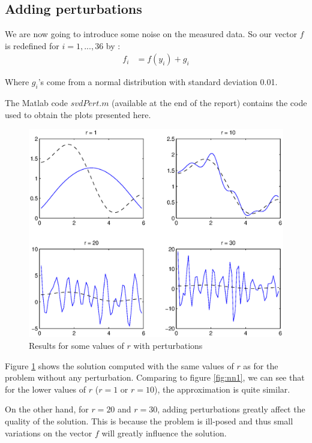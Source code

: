 \subsection*{Adding perturbations}

We are now going to introduce some noise on the measured data. So our vector $f$ is redefined for $i=1,...,36$ by :
\begin{align*}
f_i&=f(y_i)+g_i 
\end{align*}

Where $g_i$'s come from a normal distribution with standard deviation 0.01. 

The Matlab code $svdPert.m$ (available at the end of the report) contains the code used to obtain the plots presented here.

\begin{figure}
\begin{center}
\includegraphics[scale=0.6]{perturb.eps}
\caption{Results for some values of $r$ with perturbations}
\label{perturb}
\end{center}
\end{figure}

Figure \ref{perturb} shows the solution computed with the same values of $r$ as for the problem without any perturbation. Comparing to figure \ref{fig:nn1}, we can see that for the lower values of $r$ ($r=1$ or $r=10$), the approximation is quite similar. 

On the other hand, for $r=20$ and $r=30$, adding perturbations greatly affect the quality of the solution. This is because the problem is ill-posed and thus small variations on the vector $f$ will greatly influence the solution.

